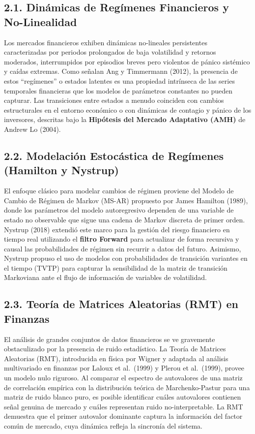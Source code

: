 \documentclass[
  12pt,
]{article}
\begin{document}
\subsection{2.1. Dinámicas de Regímenes Financieros y
No-Linealidad}\label{dinuxe1micas-de-reguxedmenes-financieros-y-no-linealidad}

Los mercados financieros exhiben dinámicas no-lineales persistentes
caracterizadas por periodos prolongados de baja volatilidad y retornos
moderados, interrumpidos por episodios breves pero violentos de pánico
sistémico y caídas extremas. Como señalan Ang y Timmermann (2012), la
presencia de estos ``regímenes'' o estados latentes es una propiedad
intrínseca de las series temporales financieras que los modelos de
parámetros constantes no pueden capturar. Las transiciones entre estados
a menudo coinciden con cambios estructurales en el entorno económico o
con dinámicas de contagio y pánico de los inversores, descritas bajo la
\textbf{Hipótesis del Mercado Adaptativo (AMH)} de Andrew Lo (2004).

\subsection{2.2. Modelación Estocástica de Regímenes (Hamilton y
Nystrup)}\label{modelaciuxf3n-estocuxe1stica-de-reguxedmenes-hamilton-y-nystrup}

El enfoque clásico para modelar cambios de régimen proviene del Modelo
de Cambio de Régimen de Markov (MS-AR) propuesto por James Hamilton
(1989), donde los parámetros del modelo autoregresivo dependen de una
variable de estado no observable que sigue una cadena de Markov discreta
de primer orden. Nystrup (2018) extendió este marco para la gestión del
riesgo financiero en tiempo real utilizando el \textbf{filtro Forward}
para actualizar de forma recursiva y causal las probabilidades de
régimen sin recurrir a datos del futuro. Asimismo, Nystrup propuso el
uso de modelos con probabilidades de transición variantes en el tiempo
(TVTP) para capturar la sensibilidad de la matriz de transición
Markoviana ante el flujo de información de variables de volatilidad.

\subsection{2.3. Teoría de Matrices Aleatorias (RMT) en
Finanzas}\label{teoruxeda-de-matrices-aleatorias-rmt-en-finanzas}

El análisis de grandes conjuntos de datos financieros se ve gravemente
obstaculizado por la presencia de ruido estadístico. La Teoría de
Matrices Aleatorias (RMT), introducida en física por Wigner y adaptada
al análisis multivariado en finanzas por Laloux et al.~(1999) y Plerou
et al.~(1999), provee un modelo nulo riguroso. Al comparar el espectro
de autovalores de una matriz de correlación empírica con la distribución
teórica de Marchenko-Pastur para una matriz de ruido blanco puro, es
posible identificar cuáles autovalores contienen señal genuina de
mercado y cuáles representan ruido no-interpretable. La RMT demuestra
que el primer autovalor dominante captura la información del factor
común de mercado, cuya dinámica refleja la sincronía del sistema.
\end{document}

